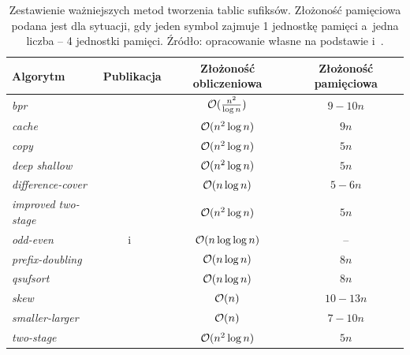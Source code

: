 \begin{table}[t]
	\begin{center}        
    \begin{tabular}{l c c c }
    \toprule
    Algorytm                  &           Publikacja            &    Złożoność obliczeniowa    & Złożoność pamięciowa \\ \midrule
    \emph{bpr}                &      \cite{schurmann-phd}       & $\mathcal{O} (\frac{n^2}{\log n})$ &       $9-10n$        \\         
    \emph{cache}              &          \cite{seward}          &     $\mathcal{O}(n^2 \log n)$      &         $9n$         \\         
    \emph{copy}               &          \cite{seward}          &     $\mathcal{O}(n^2 \log n)$      &         $5n$         \\         
    \emph{deep shallow}       &            \cite{MF}            &     $\mathcal{O}(n^2 \log n)$      &         $5n$         \\         
    \emph{difference-cover}   &      \cite{Burkhardt2003}       &      $\mathcal{O}(n \log n)$       &        $5-6n$        \\         
    \emph{improved two-stage} &            \cite{MP}            &     $\mathcal{O}(n^2 \log n)$      &         $5n$         \\         
    \emph{odd-even}           & \cite{kim} i~\cite{kim-jo-park} &    $\mathcal{O}(n \log \log n)$    &          --          \\         
    \emph{prefix-doubling}    &         \cite{Manber90}         &       $\mathcal{O}(n\log n)$       &         $8n$         \\         
    \emph{qsufsort}           &            \cite{LS}            &       $\mathcal{O}(n\log n)$       &         $8n$         \\         
    \emph{skew}               &            \cite{KS}            &          $\mathcal{O}(n)$          &       $10-13n$       \\         
    \emph{smaller-larger}     &          \cite{Ko2005}          &          $\mathcal{O}(n)$          &       $7-10n$        \\         
    \emph{two-stage}          &            \cite{IT}            &     $\mathcal{O}(n^2 \log n)$      &         $5n$         \\         
    \bottomrule
    \end{tabular}
    \end{center}                         
    \caption{Zestawienie ważniejszych metod tworzenia tablic sufiksów.
    Złożoność pamięciowa podana jest dla sytuacji, gdy jeden symbol zajmuje 1
    jednostkę pamięci a~jedna liczba -- 4 jednostki pamięci. Źródło: opracowanie
    własne na podstawie \cite{taxonomy} i~\cite{schurmann-phd}.}%
    \label{tab:alg}
\end{table}


